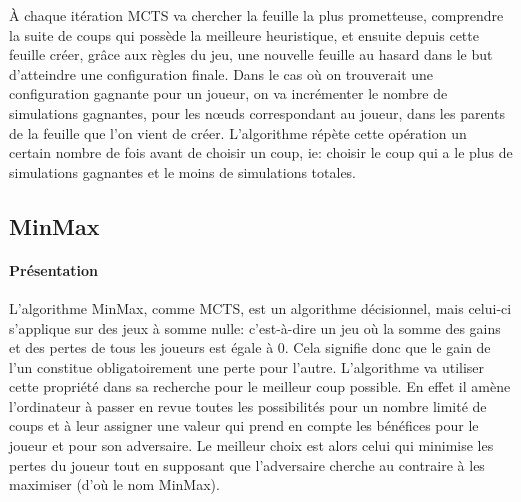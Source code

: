 À chaque itération MCTS va chercher la feuille la plus prometteuse, comprendre la suite de coups qui possède la meilleure heuristique, 
et ensuite depuis cette feuille créer, grâce aux règles du jeu, une nouvelle feuille au hasard dans le but d'atteindre une configuration finale.
Dans le cas où on trouverait une configuration gagnante pour un joueur, on va incrémenter le nombre de simulations gagnantes, pour les nœuds
correspondant au joueur, dans les parents de la feuille que l'on vient de créer.
L'algorithme répète cette opération un certain nombre de fois avant de choisir un coup, ie: choisir le coup qui a le plus de simulations
gagnantes et le moins de simulations totales.



\subsection{MinMax}

\paragraph{Présentation}
L'algorithme MinMax, comme MCTS, est un algorithme décisionnel, mais celui-ci s'applique sur des jeux à somme nulle: c'est-à-dire
un jeu où la somme des gains et des pertes de tous les joueurs est égale à 0. Cela signifie donc que le gain de l'un constitue 
obligatoirement une perte pour l'autre. L'algorithme va utiliser cette propriété dans sa recherche pour le meilleur coup possible.
En effet il amène l'ordinateur à passer en revue toutes les possibilités pour un nombre limité de coups et à leur assigner une valeur 
qui prend en compte les bénéfices pour le joueur et pour son adversaire. Le meilleur choix est alors celui qui minimise les pertes 
du joueur tout en supposant que l'adversaire cherche au contraire à les maximiser (d'où le nom MinMax).

